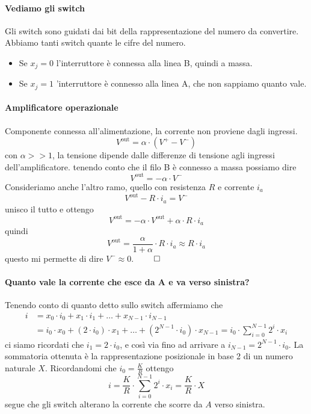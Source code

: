 \documentclass[11pt]{report}
\begin{document}
\paragraph{Vediamo gli switch} Gli switch sono guidati dai bit della rappresentazione del numero da convertire. Abbiamo tanti switch quante le cifre del numero.
\begin{itemize}
\item Se $x_j=0$ l'interruttore è connessa alla linea B, quindi a massa.
\item Se $x_j=1$ 'interruttore è connesso alla linea A, che non sappiamo quanto vale.
\end{itemize}
\paragraph{Amplificatore operazionale} Componente connessa all'alimentazione, la corrente non proviene dagli ingressi.
\[V^{\text{out}}=\alpha \cdot (V^+ - V^-)\]
con $\alpha >> 1$, la tensione dipende dalle differenze di tensione agli ingressi dell'amplificatore.
tenendo conto che il filo B è connesso a massa possiamo dire
\[V^{\text{out}}=- \alpha \cdot  V^-\]
Consideriamo anche l'altro ramo, quello con resistenza $R$ e corrente $i_a$
\[V^{\text{out}}-R \cdot i_a = V^-\]
unisco il tutto e ottengo
\[V^{\text{out}}=-\alpha \cdot V^{\text{out}} + \alpha \cdot R \cdot i_a\]
quindi
\[V^{\text{out}}=\frac{\alpha}{1+\alpha} \cdot R \cdot i_a \approx R \cdot i_a\]
questo mi permette di dire $V^- \approx 0$. $\qed$
\paragraph{Quanto vale la corrente che esce da A e va verso sinistra?} Tenendo conto di quanto detto sullo switch affermiamo che
\begin{align*}i&=x_0 \cdot i_0+ x_1 \cdot i_1 + \dots + x_{N-1} \cdot i_{N-1}\\&=i_0 \cdot x_0 + (2 \cdot i _0) \cdot x_1 + \dots + (2^{N-1} \cdot i_0) \cdot x_{N-1}=i_0 \cdot \sum_{i=0}^{N-1} 2^i \cdot x_i\end{align*}
ci siamo ricordati che $i_1=2 \cdot i_0$, e così via fino ad arrivare a $i_{N-1}= 2^{N-1} \cdot i_0$. La sommatoria ottenuta è la rappresentazione posizionale in base 2 di un numero naturale $X$. Ricordandomi che $i_0=\frac{K}{R}$ ottengo
\[i=\frac{K}{R} \cdot\sum_{i=0}^{N-1} 2^i \cdot x_i = \frac{K}{R}\cdot X\]
segue che gli switch alterano la corrente che scorre da $A$ verso sinistra.
\end{document}

